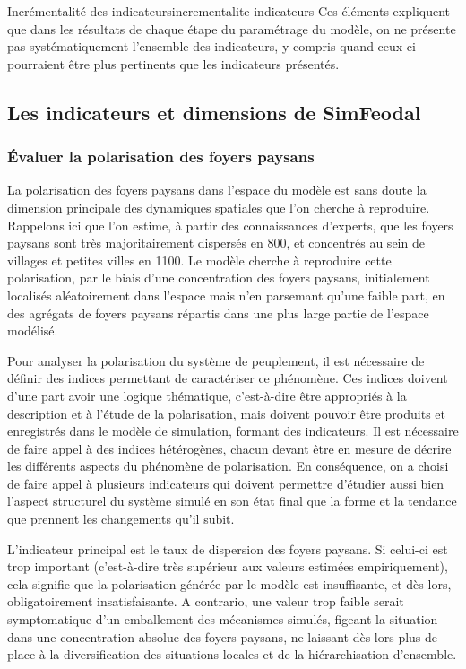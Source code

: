 \begin{encadre}{Incrémentalité des indicateurs}{incrementalite-indicateurs}
Ces éléments expliquent que dans les résultats de chaque étape du paramétrage du modèle, on ne présente pas systématiquement l'ensemble des indicateurs, y compris quand ceux-ci pourraient être plus pertinents que les indicateurs présentés.
\end{encadre}

\clearpage
\subsection{Les indicateurs et dimensions de SimFeodal}

\subsubsection{Évaluer la polarisation des foyers paysans \label{subsub:polarisation}}

La polarisation des foyers paysans dans l'espace du modèle est sans doute la dimension principale des dynamiques spatiales que l'on cherche à reproduire.
Rappelons ici que l'on estime, à partir des connaissances d'experts, que les foyers paysans sont très majoritairement dispersés en 800, et concentrés au sein de villages et petites villes en 1100.
Le modèle cherche à reproduire cette polarisation, par le biais d'une concentration des foyers paysans, initialement localisés aléatoirement dans l'espace mais n'en parsemant qu'une faible part, en des agrégats de foyers paysans répartis dans une plus large partie de l'espace modélisé.

Pour analyser la polarisation du système de peuplement, il est nécessaire de définir des indices permettant de caractériser ce phénomène.
Ces indices doivent d'une part avoir une logique thématique, c'est-à-dire être appropriés à la description et à l'étude de la polarisation, mais doivent pouvoir être produits et enregistrés dans le modèle de simulation, formant des indicateurs.
Il est nécessaire de faire appel à des indices hétérogènes, chacun devant être en mesure de décrire les différents aspects du phénomène de polarisation.
En conséquence, on a choisi de faire appel à plusieurs indicateurs qui doivent permettre d'étudier aussi bien l'aspect structurel du système simulé en son état final que la forme et la tendance que prennent les changements qu'il subit.

L'indicateur principal est le taux de dispersion des foyers paysans.
Si celui-ci est trop important (c'est-à-dire très supérieur aux valeurs estimées empiriquement), cela signifie que la polarisation générée par le modèle est insuffisante, et dès lors, obligatoirement insatisfaisante.
A contrario, une valeur trop faible serait symptomatique d'un emballement des mécanismes simulés, figeant la situation dans une concentration absolue des foyers paysans, ne laissant dès lors plus de place à la diversification des situations locales et de la hiérarchisation d'ensemble.

